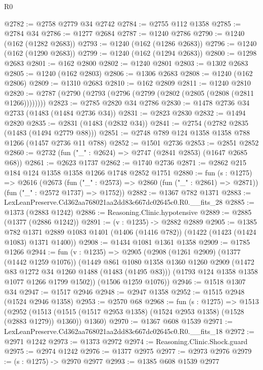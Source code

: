 \begin{lexlean}{R0}
\begin{coremodule}
@2782 := @2758 @2779 @34 @2742
@2784 := @2755 @112 @1358
@2785 := @2784 @34
@2786 := @1277 @2684
@2787 := @1240 @2786
@2790 := @1240 (@162 (@1282 @2683))
@2793 := @1240 (@162 (@1286 @2683))
@2796 := @1240 (@162 (@1290 @2683))
@2799 := @1240 (@162 (@1294 @2683))
@2800 := @1298 @2683
@2801 := @162 @2800
@2802 := @1240 @2801
@2803 := @1302 @2683
@2805 := @1240 (@162 @2803)
@2806 := @1306 @2683
@2808 := @1240 (@162 @2806)
@2809 := @1310 @2683
@2810 := @162 @2809
@2811 := @1240 @2810
@2820 := @2787 (@2790 (@2793 (@2796 (@2799 (@2802 (@2805 (@2808 (@2811 @1266))))))))
@2823 := @2785 @2820 @34 @2786
@2830 := @1478 @2736 @34 @2733 (@1483 (@1484 @2736 @34))
@2831 := @2823 @2830
@2832 := @1494 @2820
@2835 := @2831 (@1483 (@2832 @34))
@2841 := @2754 (@2782 @2835 (@1483 (@1494 @2779 @88)))
@2851 := @2748 @789 @124 @1358 @1358 @788 @1266 (@1457 @2736 @11 @788)
@2852 := @1501 @2736
@2853 := @2851 @2852
@2860 := @2732 (fun ("_" : @2624) => @2747 (@2841 @2853) (@1647 @2685 @68))
@2861 := @2623 @1737
@2862 := @1740 @2736
@2871 := @2862 @215 @184 @124 @1358 @1358 @1266 @1748 @2852 @1751
@2880 := fun (s : @1275) =>
  @2616
    (@2673
      (fun ("_" : @2573) => @2860 (fun ("_" : @2861) => @2871))
      (fun ("_" : @2572 @1737) => @1752))
@2882 := @1367 @782 @1371
@2883 := LexLeanPreserve.Cd362aa768021aa2dd83c667dc02645c0.R0.__fits_28
@2885 := @1373 (@2883 @1242)
@2886 := Reasoning.Clinic.hypotensive
@2889 := @2885 (@1377 (@2886 @1242))
@2891 := (v : @1235) -> @2882 @2889
@2905 := @1385
    @782
    @1371
    @2889
    @1083
    @1401
    (@1406 (@1416 @782))
    (@1422 (@1423 (@1424 @1083) @1371 @1400))
@2908 := @1434 @1081 @1361 @1358
@2909 := @1785 @1266
@2944 := fun (v : @1235) =>
  @2905
    (@2908
      (@1261 @2909)
      (@1377 (@1442 @1259 @1076))
      (@1449
        @861
        @1080
        @1358
        @1360
        @1260
        @2909
        (@1472 @83 @1272 @34 @1260 @1488 (@1483 (@1495 @83)))
        (@1793 @124 @1358 @1358 @1077 @1266 @1799 @1502))
      (@1506 @1259 @1076))
@2946 := @1518 @1307 @34
@2947 := @1517 @2946
@2948 := @2947 @1358
@2952 := @1515 @2948 (@1524 @2946 @1358)
@2953 := @2570 @68
@2968 := fun (s : @1275) =>
  @1513
    (@2952
      (@1513 (@1515 (@1517 @2953 @1358) (@1524 @2953 @1358) (@1528 (@2883 @1279)) @1360))
      @1360)
@2970 := @1367 @608 @1539
@2971 := LexLeanPreserve.Cd362aa768021aa2dd83c667dc02645c0.R0.__fits_18
@2972 := @2971 @1242
@2973 := @1373 @2972
@2974 := Reasoning.Clinic.Shock.guard
@2975 := @2974 @1242
@2976 := @1377 @2975
@2977 := @2973 @2976
@2979 := (s : @1275) -> @2970 @2977
@2993 := @1385
    @608
    @1539
    @2977

\end{coremodule}
\end{lexlean}

